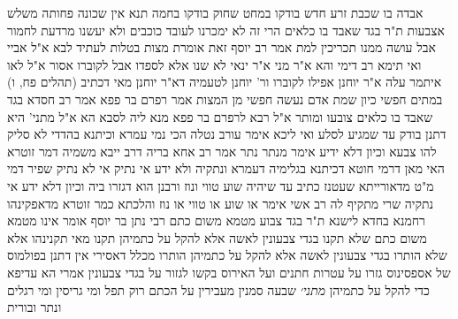 \documentclass[12pt, openany]{book}
\begin{document}
{אבדה בו שכבת זרע חדש בודקו במחט שחוק בודקו בחמה תנא אין שכונה פחותה משלש אצבעות 
ת"ר בגד שאבד בו כלאים הרי זה לא ימכרנו לעובד כוכבים ולא יעשנו מרדעת לחמור אבל עושה ממנו תכריכין למת אמר רב יוסף זאת אומרת מצות בטלות לעתיד לבא 
א"ל אביי ואי תימא רב דימי והא א"ר מני א"ר ינאי לא שנו אלא לספדו אבל לקוברו אסור א"ל לאו איתמר עלה א"ר יוחנן אפילו לקוברו 
ור' יוחנן לטעמיה דא"ר יוחנן מאי דכתיב (תהלים פח, ו) במתים חפשי כיון שמת אדם נעשה חפשי מן המצות 
אמר רפרם בר פפא אמר רב חסדא בגד שאבד בו כלאים צובעו ומותר א"ל רבא לרפרם בר פפא מנא ליה לסבא הא 
א"ל מתני' היא דתנן בודק עד שמגיע לסלע ואי ליכא אימר עורב נטלה הכי נמי עמרא וכיתנא בהדדי לא סליק להו צבעא וכיון דלא ידיע אימר מנתר נתר 
אמר רב אחא בריה דרב ייבא משמיה דמר זוטרא האי מאן דרמי חוטא דכיתנא בגלימיה דעמרא ונתקיה ולא ידע אי נתיק אי לא נתיק שפיר דמי 
מ"ט מדאורייתא שעטנז כתיב עד שיהיה שוע טווי ונוז ורבנן הוא דגזרו ביה וכיון דלא ידע אי נתקיה שרי 
מתקיף לה רב אשי אימר או שוע או טווי או נוז והלכתא כמר זוטרא מדאפקינהו רחמנא בחדא לישנא 
ת"ר בגד צבוע מטמא משום כתם רבי נתן בר יוסף אומר אינו מטמא משום כתם שלא תקנו בגדי צבעונין לאשה אלא להקל על כתמיהן 
תקנו מאי תקנינהו אלא שלא הותרו בגדי צבעונין לאשה אלא להקל על כתמיהן הותרו מכלל דאסירי 
אין דתנן בפולמוס של אספסינוס גזרו על עטרות חתנים ועל האירוס בקשו לגזור על בגדי צבעונין אמרי הא עדיפא כדי להקל על כתמיהן
{\large\emph{מתני׳}} שבעה סמנין מעבירין על הכתם רוק תפל ומי גריסין ומי רגלים ונתר ובורית}
\end{document}
